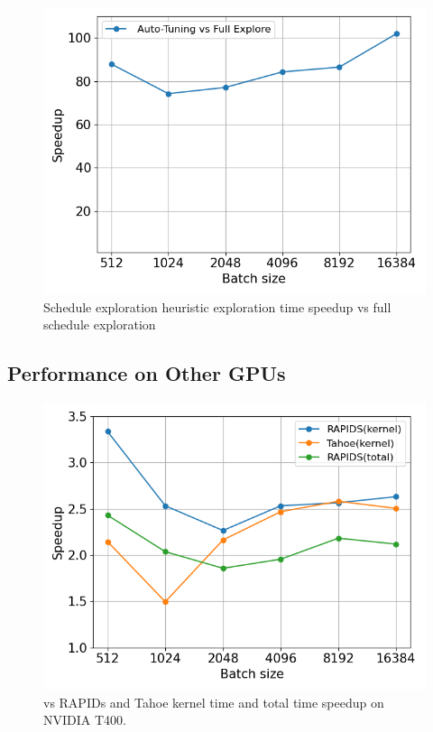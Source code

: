 \begin{figure}[htb]
  \centering
  \includegraphics[width=0.75\linewidth]{figures/geomean_speedup_4060_full_exp_vs_at.png}
  \caption{Schedule exploration heuristic exploration time speedup vs full schedule exploration}
  \label{Fig:HeuristicVsFullExplore_Speedup}
\end{figure}


\subsection{Performance on Other GPUs}
\begin{figure}[htb]
  \centering
  \includegraphics[width=0.75\linewidth]{figures/geomean_speedup_T400_kernel_time.png}
  \caption{\Treebeard{} vs RAPIDs and Tahoe kernel time and total time speedup on NVIDIA T400.}
  \label{Fig:TBvsRAPIDsTahoe_T400_Speedup}
\end{figure}

